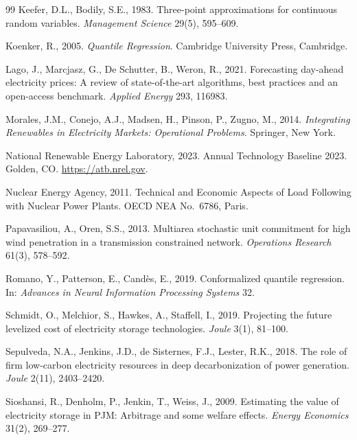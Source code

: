 \documentclass[preprint,12pt,authoryear]{elsarticle}
\begin{document}
\begin{thebibliography}{99}
Keefer, D.L., Bodily, S.E., 1983. Three-point approximations for continuous random variables. \textit{Management Science} 29(5), 595--609.

Koenker, R., 2005. \textit{Quantile Regression}. Cambridge University Press, Cambridge.

Lago, J., Marcjasz, G., De Schutter, B., Weron, R., 2021. Forecasting day-ahead electricity prices: A review of state-of-the-art algorithms, best practices and an open-access benchmark. \textit{Applied Energy} 293, 116983.

Morales, J.M., Conejo, A.J., Madsen, H., Pinson, P., Zugno, M., 2014. \textit{Integrating Renewables in Electricity Markets: Operational Problems}. Springer, New York.

National Renewable Energy Laboratory, 2023. Annual Technology Baseline 2023. Golden, CO. \url{https://atb.nrel.gov}.

Nuclear Energy Agency, 2011. Technical and Economic Aspects of Load Following with Nuclear Power Plants. OECD NEA No.~6786, Paris.

Papavasiliou, A., Oren, S.S., 2013. Multiarea stochastic unit commitment for high wind penetration in a transmission constrained network. \textit{Operations Research} 61(3), 578--592.

Romano, Y., Patterson, E., Cand\`es, E., 2019. Conformalized quantile regression. In: \textit{Advances in Neural Information Processing Systems} 32.

Schmidt, O., Melchior, S., Hawkes, A., Staffell, I., 2019. Projecting the future levelized cost of electricity storage technologies. \textit{Joule} 3(1), 81--100.

Sepulveda, N.A., Jenkins, J.D., de Sisternes, F.J., Lester, R.K., 2018. The role of firm low-carbon electricity resources in deep decarbonization of power generation. \textit{Joule} 2(11), 2403--2420.

Sioshansi, R., Denholm, P., Jenkin, T., Weiss, J., 2009. Estimating the value of electricity storage in PJM: Arbitrage and some welfare effects. \textit{Energy Economics} 31(2), 269--277.


\end{thebibliography}
\end{document}
